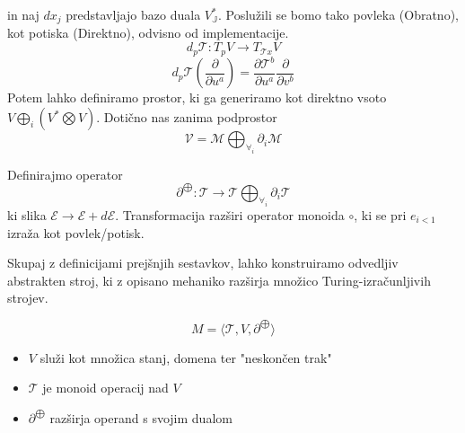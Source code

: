 \documentclass{article}
\newcommand{\JJ}{\mathbb{J}}
\newcommand{\E}{\mathcal{E}}
\newcommand{\T}{\mathcal{T}}
\begin{document}

in naj $dx_j$ predstavljajo bazo duala $V_\JJ^{*}$. Poslužili se bomo tako povleka (Obratno), kot potiska (Direktno), odvisno od implementacije.
\begin{equation}\label{eq:pushfirward}
 d_p\T: T_pV\to T_{\T x}V
\end{equation}
\begin{equation}
 d_p\T(\frac{\partial}{\partial u^a})=\frac{\partial\T^b}{\partial u^a}\frac{\partial}{\partial v^b}
\end{equation}
Potem lahko definiramo prostor, ki ga generiramo kot direktno vsoto $V\bigoplus_i (V^*\bigotimes V)$. Dotično nas zanima podprostor
$$\mathcal{V}=\mathcal{M}\bigoplus_{\forall_i}\partial_i\mathcal{M}$$
  
  Definirajmo operator 
  \begin{equation}\label{eq:dirSumFun}
  \partial^{\bigoplus}:\T\to\T\bigoplus_{\forall_i}\partial_i\T
  \end{equation}
  ki slika $\E\to\E+d\E$. Transformacija razširi operator monoida $\circ$, ki se pri $e_{i<1}$ izraža kot povlek/potisk.
  
  Skupaj z definicijami prejšnjih sestavkov, lahko konstruiramo odvedljiv abstrakten stroj, ki z opisano mehaniko razširja množico Turing-izračunljivih strojev.
  
  \begin{equation}\label{eq:dTuring}
  M=\langle\T, V, \partial^{\bigoplus}\rangle
  \end{equation}

 \begin{itemize}
 \item
 $V$ služi kot množica stanj, domena ter "neskončen trak"
 \item
 $\T$ je monoid operacij nad $V$
 \item
 $\partial^{\bigoplus}$ razširja operand s svojim dualom 
 \end{itemize}
 
\end{document}
